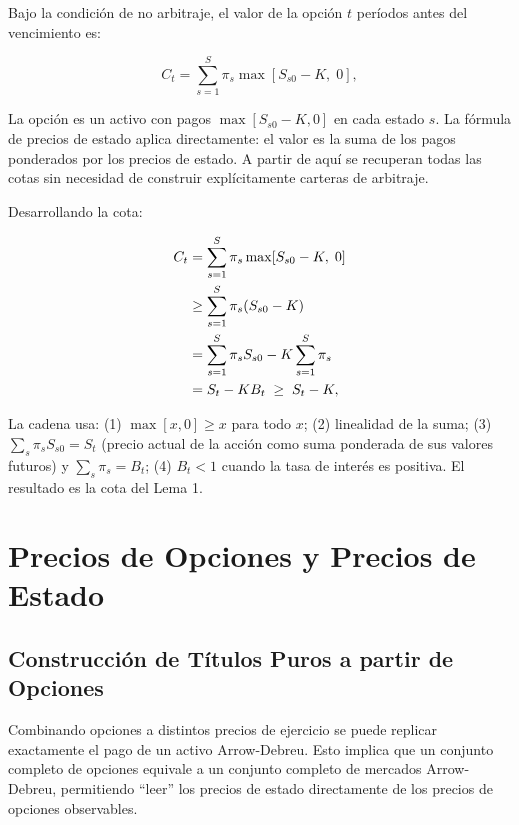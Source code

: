 \documentclass[12pt]{article}
\begin{document}
Bajo la condici\'on de no arbitraje, el valor de la opci\'on $t$ per\'iodos antes del vencimiento es:

\begin{equation}
  C_t = \sum_{s=1}^{S} \pi_s \max[S_{s0} - K,\; 0],
  \label{eq:opcionestados}
\end{equation}

\begin{intuicionmat}
La opci\'on es un activo con pagos $\max[S_{s0} - K, 0]$ en cada estado $s$. La f\'ormula de precios de estado aplica directamente: el valor es la suma de los pagos ponderados por los precios de estado. A partir de aqu\'i se recuperan todas las cotas sin necesidad de construir expl\'icitamente carteras de arbitraje.
\end{intuicionmat}

Desarrollando la cota:

\begin{align}
  C_t &= \sum_{s=1}^{S} \pi_s \max[S_{s0} - K,\; 0] \notag \\
      &\geq \sum_{s=1}^{S} \pi_s (S_{s0} - K) \notag \\
      &= \sum_{s=1}^{S} \pi_s S_{s0} - K\sum_{s=1}^{S} \pi_s \notag \\
      &= S_t - KB_t \;\geq\; S_t - K,
  \label{eq:opcioncota}
\end{align}

\begin{intuicionmat}
La cadena usa: (1) $\max[x,0] \geq x$ para todo $x$; (2) linealidad de la suma; (3) $\sum_s \pi_s S_{s0} = S_t$ (precio actual de la acci\'on como suma ponderada de sus valores futuros) y $\sum_s \pi_s = B_t$; (4) $B_t < 1$ cuando la tasa de inter\'es es positiva. El resultado es la cota del Lema 1.
\end{intuicionmat}

\section{Precios de Opciones y Precios de Estado}

\subsection{Construcci\'on de T\'itulos Puros a partir de Opciones}

\begin{intuicion}
Combinando opciones a distintos precios de ejercicio se puede replicar exactamente el pago de un activo Arrow-Debreu. Esto implica que un conjunto completo de opciones equivale a un conjunto completo de mercados Arrow-Debreu, permitiendo ``leer'' los precios de estado directamente de los precios de opciones observables.
\end{intuicion}
\end{document}
